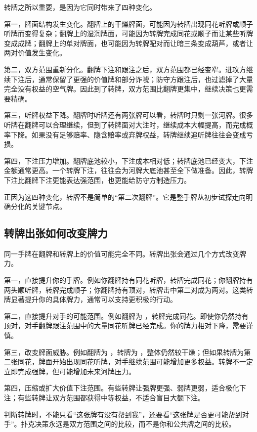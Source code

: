 转牌之所以重要，是因为它同时带来了四种变化。

第一，牌面结构发生变化。翻牌上的干燥牌面，可能因为转牌出现同花听牌或顺子听牌而变得复杂；翻牌上的湿润牌面，可能因为转牌完成同花或顺子而让某些听牌变成成牌；翻牌上的单对牌面，也可能因为转牌配对而让暗三条变成葫芦，或者让两对价值发生变化。

第二，双方范围重新分化。翻牌下注和跟注之后，双方范围都已经变窄。进攻方继续下注后，通常保留了更强的价值牌和部分诈唬；防守方跟注后，也过滤掉了大量完全没有权益的空气牌。因此到了转牌，双方范围比翻牌更集中，继续决策也更需要精确。

第三，听牌权益下降。翻牌时听牌还有两张牌可以看，转牌时只剩一张河牌。很多听牌在翻牌可以合理继续，但到了转牌面对大注时，继续成本大幅提高，而完成概率下降。如果没有足够赔率、隐含赔率或弃牌权益，转牌继续追听牌往往会变成亏损。

第四，下注压力增加。翻牌底池较小，下注成本相对低；转牌底池已经变大，下注金额通常更高。一个转牌下注，往往会为河牌大底池甚至全下做准备。因此，转牌下注比翻牌下注更能表达强范围，也更能给防守方制造压力。

正因为这四种变化，转牌不是简单的“第二次翻牌”。它是整手牌从初步试探走向明确分化的关键节点。

\subsection{转牌出张如何改变牌力}

同一手牌在翻牌和转牌上的价值可能完全不同。转牌出张会通过几个方式改变牌力。

第一，直接提升你的手牌。例如你翻牌持有同花听牌，转牌完成同花；你翻牌持有两头顺听牌，转牌完成顺子；你翻牌持有顶对，转牌击中第二对成为两对。这类转牌显著提升你的具体牌力，通常可以支持更积极的行动。

第二，直接提升对手的可能范围。例如翻牌为 ，转牌完成同花。即使你仍然持有顶对，对手翻牌跟注范围中的大量同花听牌已经完成。你的牌力相对下降，需要谨慎。

第三，改变牌面威胁。例如翻牌为 ，转牌为 ，整体仍然较干燥；但如果转牌为第二张同花，牌面开始出现同花听牌，对手继续范围可能增加更多权益。转牌不一定立即完成强牌，但可能增加未来河牌压力。

第四，压缩或扩大价值下注范围。有些转牌让强牌更强、弱牌更弱，适合极化下注；有些转牌让双方范围都获得中等权益，不适合盲目大额下注。

判断转牌时，不能只看“这张牌有没有帮到我”，还要看“这张牌是否更可能帮到对手”。扑克决策永远是双方范围之间的比较，而不是你和公共牌之间的比较。

